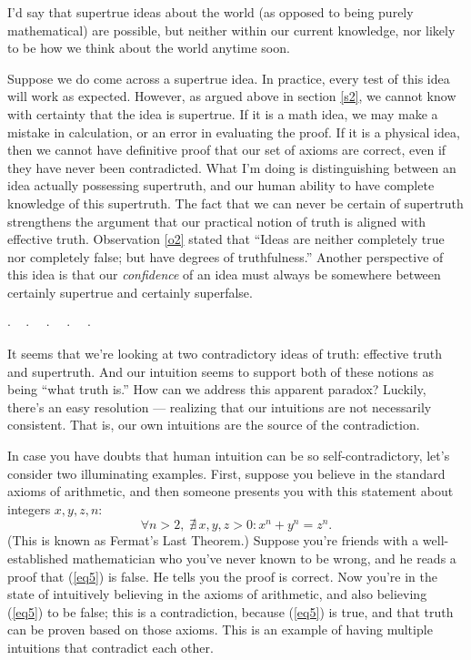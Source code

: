 \documentclass[11pt, oneside]{article}   	%
\newcommand{\dotq}{\cdot\quad}
\newcommand{\scenebreak}{
    \medskip\centerline{$\dotq\dotq\dotq\dotq\cdot$}\medskip
}
\begin{document}
I'd say that supertrue ideas about the world (as opposed to being purely
mathematical) are possible, but neither within
our current knowledge, nor likely to be how we think about the world anytime
soon.

Suppose we do come across a supertrue idea. In practice, every test of this idea
will work as expected.
However, as argued above in section \ref{s2}, we cannot know with certainty that
the idea is supertrue. If it is a math idea, we may make a mistake in
calculation, or an error in evaluating the proof. If it is a physical idea, then
we cannot have definitive proof that our set of axioms are correct, even if they
have never been contradicted. What I'm doing is distinguishing between an idea
actually possessing supertruth, and our human ability to have complete knowledge
of this supertruth. The fact that we can never be certain of supertruth
strengthens the argument that our practical notion of truth is aligned with
effective truth. Observation \ref{o2} stated that ``Ideas
are neither completely true nor completely false; but have degrees
of truthfulness.''
Another perspective of this idea is that
our {\em confidence} of an idea must always be somewhere between certainly
supertrue and certainly superfalse.

\scenebreak

It seems that we're looking at two contradictory ideas of truth: effective
truth and supertruth. And our intuition seems to support both of these notions
as being ``what truth is.'' How can we address this apparent paradox?
Luckily, there's an easy resolution --- realizing that our intuitions are not
necessarily consistent. That is, our own intuitions are the source of the
contradiction.

In case you have doubts that human intuition can be so self-contradictory, let's
consider two illuminating examples. First, suppose you believe in the standard
axioms of arithmetic, and then someone presents you with this statement about
integers $x,y,z,n$:
\begin{equation}\label{eq5}
    \forall n>2,\; \nexists\, x,y,z>0: x^n + y^n = z^n.
\end{equation}
(This is known as Fermat's Last Theorem.)
Suppose you're friends with a well-established mathematician who you've never
known to be wrong, and he reads a proof that (\ref{eq5}) is false. He tells you
the proof is correct.
Now you're in the state of intuitively believing in the axioms of arithmetic,
and also believing (\ref{eq5}) to be false; this is a contradiction, because
(\ref{eq5}) is true, and that truth can be proven based on those axioms. This is
an example of having multiple intuitions that contradict each other.
\end{document}
